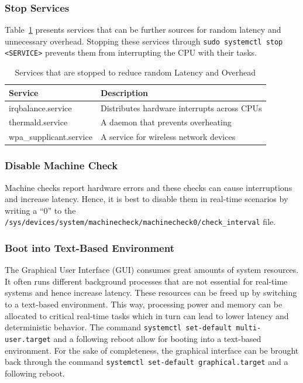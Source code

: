 \documentclass[MMR,Master,english]{style/twbook}
\begin{document}
\clearpage

\subsubsection{Stop Services}
Table~\ref{tab:stop_servies} presents services that can be further sources for random latency and unnecessary overhead. Stopping these services through \texttt{sudo systemctl stop <SERVICE>} prevents them from interrupting the CPU with their tasks.

\begin{table}[H]
	\centering
	\caption{Services that are stopped to reduce random Latency and Overhead}
	\label{tab:stop_servies}
	\setlength{\tabcolsep}{0.5em} %
	{\renewcommand{\arraystretch}{1.2}%
		\begin{tabular}{|l|l|}
			\hline
			\textbf{Service}        & \textbf{Description}                        \\
			\hline
			irqbalance.service      & Distributes hardware interrupts across CPUs \\\hline
			thermald.service        & A daemon that prevents overheating          \\\hline
			wpa\_supplicant.service & A service for wireless network devices      \\
			\hline
		\end{tabular}}
\end{table}

\subsubsection{Disable Machine Check}
Machine checks report hardware errors and these checks can cause interruptions and increase latency. Hence, it is best to disable them in real-time scenarios by writing a ``0'' to the \texttt{/sys/devices/system/machinecheck/machinecheck0/check\_interval} file.

\subsubsection{Boot into Text-Based Environment}
The Graphical User Interface (GUI) consumes great amounts of system resources. It often runs different background processes that are not essential for real-time systems and hence increase latency. These resources can be freed up by switching to a text-based environment. This way, processing power and memory can be allocated to critical real-time tasks which in turn can lead to lower latency and deterministic behavior. The command \texttt{systemctl set-default multi-user.target} and a following reboot allow for booting into a text-based environment. For the sake of completeness, the graphical interface can be brought back through the command \texttt{systemctl set-default graphical.target} and a following reboot.
\end{document}
